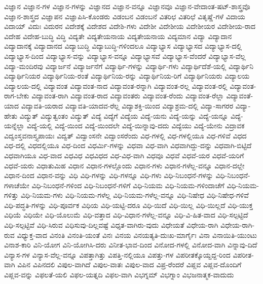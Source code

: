 {ವಿಜ್ಞಾನ
ವಿಜ್ಞಾನ-ಗಳ
ವಿಜ್ಞಾನ-ಗಳನ್ನು
ವಿಜ್ಞಾನದ
ವಿಜ್ಞಾನ-ವನ್ನೂ
ವಿಜ್ಞಾನವೂ
ವಿಜ್ಞಾನ-ವೇದಾಂತ-ಷಟ್-ಶಾಸ್ತ್ರವೊ
ವಿಜ್ಞಾನ-ಶಾಸ್ತ್ರದ
ವಿಜ್ಞಾಪನ
ವಿಜ್ಞಾಪಿಸಿ-ಕೊಂಡರು
ವಿಡಂಬನ
ವಿಡಂಬನೆ
ವಿತರಿಛ
ವಿತರಿಛೆ
ವಿತೃಷ್ಣೆ-ಗಳೆ
ವಿದಾಯ
ವಿದಾಯ್
ವಿದುಃ
ವಿದುರನ
ವಿದೇಶಕ್ಕೆ
ವಿದೇಶದ
ವಿದೇಶಿ-ಗಳು
ವಿದೇಶೀ
ವಿದೇಶೀಯ
ವಿದೇಶೀಯರ
ವಿದೇಶೀಯ-ರಾದ
ವಿದೇಹ
ವಿದೇಹ-ಬುದ್ಧಿ
ವಿದ್ಧಿ
ವಿದ್ಯತೇ
ವಿದ್ಯತೇಯನಾಯ
ವಿದ್ಯತೇಯನಾಯ
ವಿದ್ಯಮಾನ
ವಿದ್ಯಾ
ವಿದ್ಯಾದಾನ
ವಿದ್ಯಾದಾನಕ್ಕೆ
ವಿದ್ಯಾದಾನದ
ವಿದ್ಯಾಬುದ್ಧಿ
ವಿದ್ಯಾಬುದ್ಧಿ-ಗಳಿಂದಲೂ
ವಿದ್ಯಾಭ್ಯಾಸ
ವಿದ್ಯಾಭ್ಯಾಸದ
ವಿದ್ಯಾಭ್ಯಾಸ-ದಲ್ಲಿ
ವಿದ್ಯಾಭ್ಯಾಸ-ದಿಂದ
ವಿದ್ಯಾಭ್ಯಾಸ-ವನ್ನು
ವಿದ್ಯಾಭ್ಯಾಸ-ವನ್ನೂ
ವಿದ್ಯಾಭ್ಯಾಸವೆ
ವಿದ್ಯಾಭ್ಯಾಸ-ವೆಂದರೆ
ವಿದ್ಯಾಭ್ಯಾಸ-ವೆಲ್ಲ
ವಿದ್ಯಾ-ಮಂದಿರವು
ವಿದ್ಯಾರ್ಜನೆ
ವಿದ್ಯಾರ್ಜನೆಗೆ
ವಿದ್ಯಾರ್ಥಿ-ಗಳನ್ನು
ವಿದ್ಯಾರ್ಥಿ-ಗಳು
ವಿದ್ಯಾರ್ಥಿದೆಶೆ-ಯಲ್ಲಿ
ವಿದ್ಯಾರ್ಥಿನಿ
ವಿದ್ಯಾರ್ಥಿನಿಯರ
ವಿದ್ಯಾರ್ಥಿನಿಯ-ರಂತೆ
ವಿದ್ಯಾರ್ಥಿನಿಯ-ರನ್ನು
ವಿದ್ಯಾರ್ಥಿನಿಯ-ರಿಗೆ
ವಿದ್ಯಾರ್ಥಿನಿಯರು
ವಿದ್ಯಾಲಯ
ವಿದ್ಯಾಲಯ-ದಲ್ಲಿ
ವಿದ್ಯಾವಂತ
ವಿದ್ಯಾವಂತ-ನಾದ
ವಿದ್ಯಾವಂತ-ರನ್ನಾಗಿ
ವಿದ್ಯಾವಂತ-ರಲ್ಲ
ವಿದ್ಯಾವಂತ-ರಲ್ಲಿ
ವಿದ್ಯಾವಂತ-ರಾಗ-ಬೇಕು
ವಿದ್ಯಾವಂತ-ರಾಗಿ
ವಿದ್ಯಾವಂತ-ರಾದ
ವಿದ್ಯಾವಂತರು
ವಿದ್ಯಾವಂತ-ರೆಂದು
ವಿದ್ಯಾವಂತ-ರೆಲ್ಲಾ
ವಿದ್ಯಾವಂತೆ-ಯಾದ
ವಿದ್ಯಾವತಿ-ಯರಾದ
ವಿದ್ಯಾವತಿ-ಯಾದವ-ರೆಲ್ಲ
ವಿದ್ಯಾಶಕ್ತಿ-ಯಿಂದ
ವಿದ್ಯಾಶ್ರಮ-ದಲ್ಲಿ
ವಿದ್ಯಾ-ಸಾಗರರ
ವಿದ್ಯಾ-ಹೇತು
ವಿದ್ಯುತ್
ವಿದ್ಯುತ್ವಂತಂ
ವಿದ್ಯುತ್
ವಿದ್ಯೆ
ವಿದ್ಯೆಗೆ
ವಿದ್ಯೆಯ
ವಿದ್ಯೆ-ಯನು
ವಿದ್ಯೆ-ಯನ್ನು
ವಿದ್ಯೆ-ಯನ್ನೂ
ವಿದ್ಯೆ-ಯನ್ನೆಲ್ಲಾ
ವಿದ್ಯೆ-ಯಲ್ಲಿ
ವಿದ್ಯೆ-ಯಿಂದ
ವಿದ್ಯೆ-ಯಿಂದಲೇ
ವಿದ್ಯೆ-ಯಿನ್ನಾವು-ದದು
ವಿದ್ಯೆಯು
ವಿದ್ಯೆ-ಯೇನು
ವಿದ್ರಾವಕ
ವಿದ್ವಂಸ್ತವನಾಸ್ತ್ಯಪಾಯಃ
ವಿದ್ವತ್
ವಿದ್ವಾಂಸನೇ
ವಿದ್ವಾಂಸರೆಂದು
ವಿಧ-ಗಳಲ್ಲಿ
ವಿಧ-ಗಳಲ್ಲಿಯೂ
ವಿಧ-ಗಳಿವೆ
ವಿಧದ
ವಿಧ-ದಲ್ಲಿ
ವಿಧದಲ್ಲಿಯೂ
ವಿಧ-ದಿಂದ
ವಿಧರ್ಮಿ-ಗಳನ್ನು
ವಿಧವಾ
ವಿಧ-ವಾಗಿ
ವಿಧವಾಗಿದ್ದು-ದನ್ನು
ವಿಧವಾಗಿ-ಬಿಟ್ಟಿದೆ
ವಿಧವಾಗಿಯೂ
ವಿಧ-ವಾದ
ವಿಧವಿಧ
ವಿಧವಿಧದ
ವಿಧ-ವಿಧ-ವಾಗಿ
ವಿಧವೂ
ವಿಧವೆ
ವಿಧವೆ-ಯರ
ವಿಧವೆ-ಯರಿಗೆ
ವಿಧವೆ-ಯರು
ವಿಧಾತುಮಿಹ
ವಿಧಾನ
ವಿಧಾನ-ಗಳಲ್ಲೊಂದು
ವಿಧಾನ-ಗಳು
ವಿಧಾನ-ಗಳೆಲ್ಲ-ವನ್ನೂ
ವಿಧಾನ-ದಲ್ಲೇ
ವಿಧಾನ-ದಿಂದ
ವಿಧಾನ-ವನ್ನು
ವಿಧಿ
ವಿಧಿ-ಗಳನ್ನು
ವಿಧಿ-ಗಳನ್ನೂ
ವಿಧಿ-ಗಳು
ವಿಧಿ-ನಿಬಂಧನೆ-ಗಳನ್ನು
ವಿಧಿ-ನಿಬಂಧನೆ-ಗಳಾಚೆಯೇ
ವಿಧಿ-ನಿಬಂಧನೆ-ಗಳಿಂದ
ವಿಧಿ-ನಿಬಂಧನೆ-ಗಳಿಗೆ
ವಿಧಿ-ನಿಯಮ
ವಿಧಿ-ನಿಯಮ-ಗಳಿಂದಾಚೆಗೆ
ವಿಧಿ-ನಿಯಮ-ಗಳಿತ್ತು
ವಿಧಿ-ನಿಯಮ-ಗಳು
ವಿಧಿ-ನಿಯಮ-ಗಳೆಲ್ಲ
ವಿಧಿ-ನಿಯಮ-ಗಳೆಲ್ಲ-ವನ್ನೂ
ವಿಧಿ-ನಿಷೇಧ
ವಿಧಿ-ನಿಷೇಧ-ಗಳಿವೆ
ವಿಧಿ-ಪದ್ಧತಿ-ಗಳನ್ನು
ವಿಧಿ-ಪೂರ್ವಕ
ವಿಧಿಯ
ವಿಧಿ-ಯಟ್ಟಿ-ದರೂ
ವಿಧಿ-ಯಿದೆ
ವಿಧಿ-ಯಿಲ್ಲ
ವಿಧಿ-ಯಿಲ್ಲದೆ
ವಿಧಿ-ಯುಕ್ತ
ವಿಧಿಯೆ
ವಿಧಿಯೇ
ವಿಧಿ-ಯೊಲುಮೆ
ವಿಧಿ-ವತ್ತಾದ
ವಿಧಿ-ವಿಧಾನ-ಗಳೆಲ್ಲ-ವನ್ನೂ
ವಿಧಿ-ವಿ-ಹಿತ-ವಾದ
ವಿಧಿ-ಸಲ್ಪಟ್ಟಿದೆ
ವಿಧಿ-ಸಲ್ಪಟ್ಟಿವೆ
ವಿಧಿ-ಸಿರುವ
ವಿಧಿಸುವು-ದಿಲ್ಲವಷ್ಟೆ
ವಿಧೃತ-ವಾಗಿರು-ವುದು
ವಿಧೇಯತೆ
ವಿಧೇಯ-ರಾಗಿ
ವಿಧೇಯ-ರಾಗಿ-ರುವ
ವಿಧ್ಯುಕ್ತ-ವಾದ
ವಿನಂತಿ
ವಿನಂತಿ-ಯಂತೆ
ವಿನಃ
ವಿನಯ
ವಿನಯತ್ಯತಿ-ದುಃಖ-ಮಾರ್ಗೈಃ
ವಿನಾ
ವಿನಾಯಿತಿ-ಯುಂಟು
ವಿನಾಶ-ಕಾರಿ
ವಿನಿ-ಯೋಗ
ವಿನಿ-ಯೋಗಿಸಿ-ದರು
ವಿನೀತ-ಭಾವ-ದಿಂದ
ವಿನೋದ-ಗಳಲ್ಲಿ
ವಿನೋದ-ವಾಗಿ
ವಿನ್ನಾವು-ದಿದೆ
ವಿನ್ಯಾಸ-ಗಳ
ವಿನ್ಯಾಸ-ವೆಲ್ಲ-ವನ್ನೂ
ವಿಪತ್ತಾಗಿತ್ತು
ವಿಪತ್ತಿ-ನಲ್ಲಿಯೂ
ವಿಪತ್ತು-ಗಳ
ವಿಪರೀತಕ್ಕೊಯ್ದದ್ದ-ರಿಂದ
ವಿಪರೀತ-ವಾಗಿ
ವಿಪಿನ
ವಿಪಿನದಲಿ
ವಿಪುಲ-ವಾಗಿದೆ
ವಿಪುಲ-ವಾತಃ
ವಿಪುಲ-ವಾದ
ವಿಪ್ರ-ರೆಂದರೆ
ವಿಪ್ಲವ
ವಿಪ್ಲವ-ದೊಂದಿಗೆ
ವಿಪ್ಲವ-ವನ್ನು
ವಿಫಲತೆ-ಯಲಿ
ವಿಫಲ-ಯತ್ನದಿ
ವಿಫಲ-ವಾಗಿ
ವಿಭಗ್ನಮ್
ವಿಭಗ್ನಾಂ
ವಿಭಜನಾತ್ಮಕ-ವಾದುದು
}
